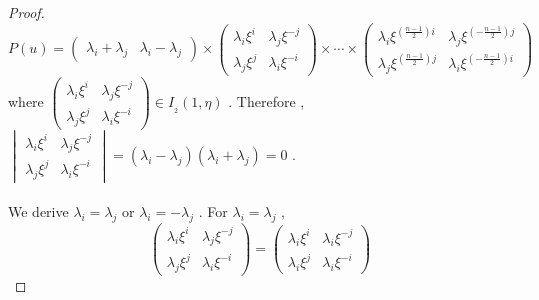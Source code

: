 \documentclass{article}
\begin{document}
\begin{proof}
\begin{equation*}
    P(u)=\begin{pmatrix}
          \lambda_i+\lambda_j&\lambda_i-\lambda_j
        \end{pmatrix}
        \times
        \begin{pmatrix}
            \lambda_i\xi^{\scriptscriptstyle i}&\lambda_j\xi^{\scriptscriptstyle-j}\\
            \lambda_j\xi^{\scriptscriptstyle j}&\lambda_i\xi^{\scriptscriptstyle-i}
        \end{pmatrix}
        \times\cdots\times
        \begin{pmatrix}
            \lambda_i\xi^{\scriptscriptstyle(\frac{n-1}{2})i}&\lambda_j\xi^{(\scriptscriptstyle-\frac{n-1}{2})j}\\
            \lambda_j\xi^{\scriptscriptstyle(\frac{n-1}{2})j}&\lambda_i\xi^{(\scriptscriptstyle-\frac{n-1}{2})i}
        \end{pmatrix}
\end{equation*}
where $\begin{pmatrix}
            \lambda_i\xi^{\scriptscriptstyle i}&\lambda_j\xi^{\scriptscriptstyle-j}\\
            \lambda_j\xi^{\scriptscriptstyle j}&\lambda_i\xi^{\scriptscriptstyle-i}
        \end{pmatrix}\in{I_{_2}}(1,\eta)$ . 
Therefore , 
$\begin{vmatrix}
            \lambda_i\xi^{\scriptscriptstyle i}&\lambda_j\xi^{\scriptscriptstyle-j}\\
            \lambda_j\xi^{\scriptscriptstyle j}&\lambda_i\xi^{\scriptscriptstyle-i}
\end{vmatrix}=(\lambda_i-\lambda_j)(\lambda_i+\lambda_j)=0$ .\\
\quad\\
We derive $\lambda_i=\lambda_j$ or $\lambda_i=-\lambda_j$ . For $\lambda_i=\lambda_j$ , 
\begin{equation*}
    \begin{pmatrix}
        \lambda_i\xi^{\scriptscriptstyle i}&\lambda_j\xi^{\scriptscriptstyle-j}\\
        \lambda_j\xi^{\scriptscriptstyle j}&\lambda_i\xi^{\scriptscriptstyle-i}
    \end{pmatrix}
    =
    \begin{pmatrix}
        \lambda_i\xi^{\scriptscriptstyle i}&\lambda_i\xi^{\scriptscriptstyle-j}\\
        \lambda_i\xi^{\scriptscriptstyle j}&\lambda_i\xi^{\scriptscriptstyle-i}

\end{pmatrix}
\end{equation*}
\end{proof}
\end{document}
